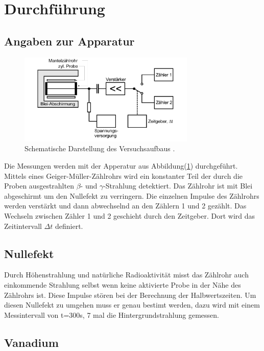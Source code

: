 \section{Durchführung}

\subsection{Angaben zur Apparatur}

\begin{figure}[H]
    \centering
    \includegraphics[width=0.75\textwidth]{images/Theorie3.PNG}
    \caption{Schematische Darstellung des Versuchsaufbaus \protect \cite{V702}.}
    \label{img:Apparatur}
\end{figure}

\noindent Die Messungen werden mit der Apperatur aus Abbildung(\ref{img:Apparatur}) durchgeführt. Mittels eines Geiger-Müller-Zählrohrs wird ein konstanter 
Teil der durch die Proben ausgestrahlten $\beta$- und $\gamma$-Strahlung detektiert. Das Zählrohr ist mit Blei abgeschirmt um den Nullefekt zu verringern.
Die einzelnen Impulse des Zählrohrs werden verstärkt und dann abwechselnd an den Zählern 1 und 2 gezählt. Das Wechseln zwischen Zähler 1 und 2 
geschieht durch den Zeitgeber. Dort wird das Zeitintervall $\Delta t$ definiert.
\subsection{Nullefekt}
\noindent Durch Höhenstrahlung und natürliche Radioaktivität misst das Zählrohr auch einkommende Strahlung selbst wenn keine aktivierte Probe in der 
Nähe des Zählrohrs ist. Diese Impulse stören bei der Berechnung der Halbwertszeiten. Um diesen Nullefekt zu umgehen muss er genau bestimt werden, 
dazu wird mit einem Messintervall von t=300s, 7 mal die Hintergrundstrahlung gemessen.


\subsection{Vanadium}


